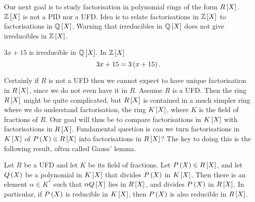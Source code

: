Our next goal is to study factorisation in polynomial rings of the form $ R\sb{X} $. $ \Z\sb{X} $ is not a PID nor a UFD. Idea is to relate factorisations in $ \Z\sb{X} $ to factorisations in $ \Q\sb{X} $. Warning that irreducibles in $ \Q\sb{X} $ does not give irreducibles in $ \Z\sb{X} $.

\begin{example2}
$ 3x + 15 $ is irreducible in $ \Q\sb{X} $. In $ \Z\sb{X} $
$$ 3x + 15 = 3\rb{x + 15}. $$
\end{example2}

Certainly if $ R $ is not a UFD then we cannot expect to have unique factorisation in $ R\sb{X} $, since we do not even have it in $ R $. Assume $ R $ is a UFD. Then the ring $ R\sb{X} $ might be quite complicated, but $ R\sb{X} $ is contained in a much simpler ring where we do understand factorisation, the ring $ K\sb{X} $, where $ K $ is the field of fractions of $ R $. Our goal will thus be to compare factorisations in $ K\sb{X} $ with factorisations in $ R\sb{X} $. Fundamental question is can we turn factorisations in $ K\sb{X} $ of $ P\rb{X} \in R\sb{X} $ into factorisations in $ R\sb{X} $? The key to doing this is the following result, often called Gauss' lemma.

\begin{theorem}
\label{thm:9.2.1}
Let $ R $ be a UFD and let $ K $ be its field of fractions. Let $ P\rb{X} \in R\sb{X} $, and let $ Q\rb{X} $ be a polynomial in $ K\sb{X} $ that divides $ P\rb{X} $ in $ K\sb{X} $. Then there is an element $ \alpha \in K^* $ such that $ \alpha Q\sb{X} $ lies in $ R\sb{X} $, and divides $ P\rb{X} $ in $ R\sb{X} $. In particular, if $ P\rb{X} $ is reducible in $ K\sb{X} $, then $ P\rb{X} $ is also reducible in $ R\sb{X} $.
\end{theorem}

